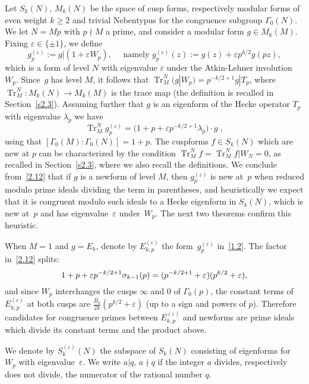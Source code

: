 \documentclass{amsart}
\theoremstyle{plain}
\theoremstyle{definition}
\numberwithin{equation}{section}
\def\tr{\operatorname{Tr}}\def\id{\mathrm{Id}}
\def\e{\varepsilon} \def\DD{\Delta} \def\G{\Gamma}\def\om{\omega}
\def\be{\begin{equation}}  \def\ee{\end{equation}}
\def\rar{\rightarrow}\def\FF{\mathbb{F}}
\begin{document}
Let $S_k(N)$, $M_k(N)$ be the space of cusp forms, respectively modular forms
of even weight $k\ge 2$ and trivial Nebentypus for the congruence subgroup $\G_0(N)$. 
We let $N=Mp$ with $p\nmid M$ a prime, and consider a modular form  
$g\in M_k(M)$. Fixing $\e\in\{\pm 1\}$,  
we define 
\be\label{1.2}
g^{(\e)}_p:=g|(1+\e W_p),\quad \text{ namely } 
g^{(\e)}_p(z):=g(z)+\e p^{k/2}g(pz),
\ee
which is a form of level $N$ with eigenvalue $\e$ under the Atkin-Lehner 
involution $W_p$.  Since~$g$ has level $M$, it follows that
$\tr^N_M (g|W_p) = p^{-k/2+1} g|T_p$,
where $\tr^N_M:M_k(N)\rar M_k(M)$ is the trace map (the definition is recalled in Section~\ref{s2.3}). 
Assuming further that $g$ is an eigenform of the Hecke operator $T_p$ with 
eigenvalue $\lambda_p$ we have
\be\label{2.12}
     \tr^N_M g^{(\e)}_p =\big(1+p+\e p^{-k/2+1} \lambda_p\big) \cdot  g\;, 
\ee
using that $[\G_0(M):\G_0(N)]=1+p$. The cuspforms $f\in S_k(N)$ which 
are new at $p$ can be characterized by the condition $\tr^N_M f=\tr^N_M f|W_N =0$, as recalled in
Section~\ref{s2.3}, where we also recall the definitions. We conclude from~\eqref{2.12} that if $g$ is a newform of level $M$,
then $g^{(\e)}_p$ is new at~$p$ when reduced modulo prime ideals dividing the term in parentheses,
and heuristically we expect that it is congruent modulo such ideals to a Hecke eigenform in 
$S_k(N)$, which is new at~$p$ and has eigenvalue~$\e$ under~$W_p$. 
The next two theorems confirm this heuristic.  

When $M=1$ and $g=E_k$, denote by $E_{k,p}^{(\e)}$ the form~$g_p^{(\e)}$
in~\eqref{1.2}.  The factor in~\eqref{2.12} splits: 
\[ 1+p+\e p^{-k/2+1}\ss_{k-1}(p) =(p^{-k/2+1}+\e)(p^{k/2}+\e), \]
and since $W_p$ interchanges 
the cusps $\infty$ and 0 of $\G_0(p)$, the constant terms of 
$E_{k,p}^{(\e)}$ at both cusps are $\frac{B_k}{2k}(p^{k/2}+\e)$ 
(up to a sign and powers of $p$). Therefore candidates for congruence primes 
between $E_{k,p}^{(\e)}$ and newforms are prime ideals which 
divide its constant terms and the product above. 

We denote by  $S_k^{(\e)}(N)$ the subspace of $S_k(N)$ consisting of 
eigenforms for~$W_p$ with eigenvalue~$\e$. We write $a|q$, $a\nmid q$ if the 
integer $a$ divides, respectively does not divide, the numerator of the rational
number $q$. 
\end{document}
